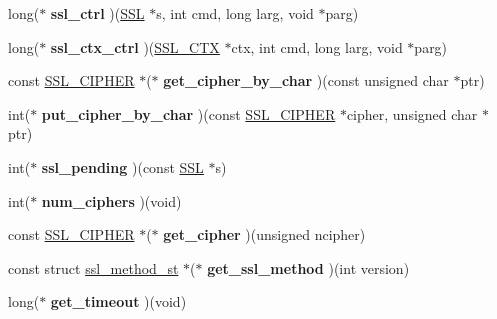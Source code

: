 \begin{DoxyCompactItemize}
long($\ast$ {\bfseries ssl\+\_\+ctrl} )(\hyperlink{structssl__st}{S\+SL} $\ast$s, int cmd, long larg, void $\ast$parg)
\item 
\mbox{\label{structssl__method__st_a894ef584342f0b95ab4156cada689c99}} 
long($\ast$ {\bfseries ssl\+\_\+ctx\+\_\+ctrl} )(\hyperlink{structssl__ctx__st}{S\+S\+L\+\_\+\+C\+TX} $\ast$ctx, int cmd, long larg, void $\ast$parg)
\item 
\mbox{\label{structssl__method__st_a51d27641af1ef292ad991acab889eb69}} 
const \hyperlink{structssl__cipher__st}{S\+S\+L\+\_\+\+C\+I\+P\+H\+ER} $\ast$($\ast$ {\bfseries get\+\_\+cipher\+\_\+by\+\_\+char} )(const unsigned char $\ast$ptr)
\item 
\mbox{\label{structssl__method__st_a625829ff35be4426d905e44ea04024cf}} 
int($\ast$ {\bfseries put\+\_\+cipher\+\_\+by\+\_\+char} )(const \hyperlink{structssl__cipher__st}{S\+S\+L\+\_\+\+C\+I\+P\+H\+ER} $\ast$cipher, unsigned char $\ast$ptr)
\item 
\mbox{\label{structssl__method__st_a8fd510a866d8754bfd60e897ccb8d3b4}} 
int($\ast$ {\bfseries ssl\+\_\+pending} )(const \hyperlink{structssl__st}{S\+SL} $\ast$s)
\item 
\mbox{\label{structssl__method__st_ad67301b9f432dca1d82eda0a2a73d402}} 
int($\ast$ {\bfseries num\+\_\+ciphers} )(void)
\item 
\mbox{\label{structssl__method__st_aa5b037fbac753dc98291d099d817a072}} 
const \hyperlink{structssl__cipher__st}{S\+S\+L\+\_\+\+C\+I\+P\+H\+ER} $\ast$($\ast$ {\bfseries get\+\_\+cipher} )(unsigned ncipher)
\item 
\mbox{\label{structssl__method__st_a601499546a57b7fc73461cca2588a316}} 
const struct \hyperlink{structssl__method__st}{ssl\+\_\+method\+\_\+st} $\ast$($\ast$ {\bfseries get\+\_\+ssl\+\_\+method} )(int version)
\item 
\mbox{\label{structssl__method__st_a5a153fd1d3f82198c14ceca526c07efa}} 
long($\ast$ {\bfseries get\+\_\+timeout} )(void)
\item 

\end{DoxyCompactItemize}
